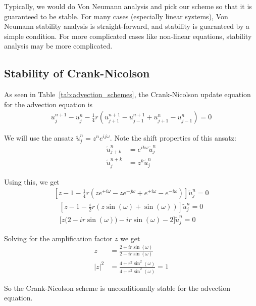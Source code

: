 \documentclass[twocolumn]{myarticle}
\begin{document}
Typically, we would do Von Neumann analysis and pick our scheme so that it is guaranteed to be stable.
For many cases (especially linear systems), Von Neumann stability analysis is straight-forward, and stability is guaranteed by a simple condition.
For more complicated cases like non-linear equations, stability analysis may be more complicated.

\subsection{Stability of Crank-Nicolson}
\label{subsec:stability_of_crank_nicolson}

As seen in Table~\ref{tab:advection_schemes}, the Crank-Nicolson update equation for the advection equation is
\begin{align}
    u^{n+1}_j - u^{n}_j - \frac{1}{4} r \left( u^{n+1}_{j+1} - u^{n+1}_{j-1} + u^{n}_{j+1} - u^{n}_{j-1}\right) = 0
\end{align}

We will use the ansatz $ \tilde{u}^n_j = z^n e^{i j \omega} $.
Note the shift properties of this ansatz:
\begin{align}
    \tilde{u}^{n}_{j+k} &= e^{i k \omega} \tilde{u}^{n}_{j} \label{eq:space_shift_property}
    \\
    \tilde{u}^{n+k}_{j} &= z^{k} \tilde{u}^{n}_{j} \label{eq:time_shift_property}
\end{align}

Using this, we get
\begin{align}
    \left[ z - 1 - \frac{1}{4} r \left( z e^{+i\omega} - z e^{-j\omega} + e^{+i\omega} - e^{-i\omega} \right) \right] \tilde{u}^{n}_{j} = 0
\end{align}
\begin{align}
    \left[ z - 1 - \frac{i}{2} r \left( z \sin(\omega) + \sin(\omega) \right) \right] \tilde{u}^{n}_{j} = 0
    \\
    \Big[ z \big( 2 - i r \sin(\omega) \big) - i r \sin(\omega) - 2 \Big] \tilde{u}^{n}_{j} = 0
\end{align}

Solving for the amplification factor $ z $ we get
\begin{align}
    z &= \frac{2 + i r \sin(\omega)}{2 - i r \sin(\omega)}
    \\
    |z|^2 &= \frac{4 + r^2 \sin^2(\omega)}{4 + r^2 \sin^2(\omega)} = 1
\end{align}

So the Crank-Nicolson scheme is unconditionally stable for the advection equation.
\end{document}
